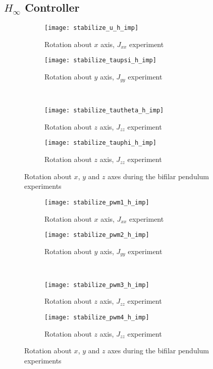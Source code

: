 \begin{appendices}
\subsection*{$H_\infty$ Controller}

\begin{figure}[H]
\begin{subfigure}{.5\linewidth}
\centering
\texttt{[image: stabilize\_u\_h\_imp]}
\caption{Rotation about $x$ axis, $J_{xx}$ experiment}
\label{fig:stabilize_u_h_imp}
\end{subfigure}%
\begin{subfigure}{.5\linewidth}
\centering
\texttt{[image: stabilize\_taupsi\_h\_imp]}
\caption{Rotation about $y$ axis, $J_{yy}$ experiment}
\label{fig:stabilize_taupsi_h_imp}
\end{subfigure}\\[1ex]
\begin{subfigure}{0.5\linewidth}
\centering
\texttt{[image: stabilize\_tautheta\_h\_imp]}
\caption{Rotation about $z$ axis, $J_{zz}$ experiment}
\label{fig:stabilize_tautheta_h_imp}
\end{subfigure}
\begin{subfigure}{0.5\linewidth}
\centering
\texttt{[image: stabilize\_tauphi\_h\_imp]}
\caption{Rotation about $z$ axis, $J_{zz}$ experiment}
\label{fig:stabilize_tauphi_h_imp}
\end{subfigure}
\caption{Rotation about $x$, $y$ and $z$ axes during the bifilar pendulum experiments}
\label{fig:stabilize_control_h}
\end{figure}

\begin{figure}[H]
\begin{subfigure}{.5\linewidth}
\centering
\texttt{[image: stabilize\_pwm1\_h\_imp]}
\caption{Rotation about $x$ axis, $J_{xx}$ experiment}
\label{fig:stabilize_pwm_h_imp}
\end{subfigure}%
\begin{subfigure}{.5\linewidth}
\centering
\texttt{[image: stabilize\_pwm2\_h\_imp]}
\caption{Rotation about $y$ axis, $J_{yy}$ experiment}
\label{fig:stabilize_pwm2_h_imp}
\end{subfigure}\\[1ex]
\begin{subfigure}{0.5\linewidth}
\centering
\texttt{[image: stabilize\_pwm3\_h\_imp]}
\caption{Rotation about $z$ axis, $J_{zz}$ experiment}
\label{fig:stabilize_pwm3_h_imp}
\end{subfigure}
\begin{subfigure}{0.5\linewidth}
\centering
\texttt{[image: stabilize\_pwm4\_h\_imp]}
\caption{Rotation about $z$ axis, $J_{zz}$ experiment}
\label{fig:stabilize_pwm4_h_imp}
\end{subfigure}
\caption{Rotation about $x$, $y$ and $z$ axes during the bifilar pendulum experiments}
\label{fig:stabilize_pwm_h}
\end{figure}



\end{appendices}
